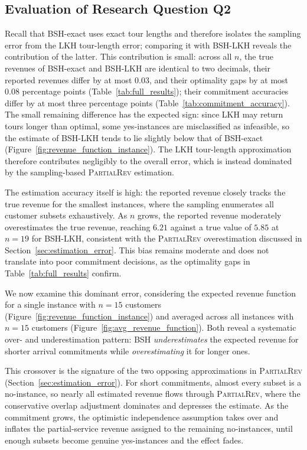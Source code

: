 \documentclass[11pt]{article}
\theoremstyle{plain}
\theoremstyle{definition}
\begin{document}
 

\subsection{Evaluation of Research Question Q2}\label{subsec:ErrorSources}
 Recall that BSH-exact uses exact tour lengths and therefore isolates the sampling error from the \ac{LKH} tour-length error; comparing it with BSH-\ac{LKH} reveals the contribution of the latter. This contribution is small: across all $n$, the true revenues of BSH-exact and BSH-\ac{LKH} are identical to two decimals, their reported revenues differ by at most $0.03$, and their optimality gaps by at most $0.08$ percentage points (Table~\ref{tab:full_results}); their commitment accuracies differ by at most three percentage points (Table~\ref{tab:commitment_accuracy}). The small remaining difference has the expected sign: since \ac{LKH} may return tours longer than optimal, some yes-instances are misclassified as infeasible, so the estimate of BSH-\ac{LKH} tends to lie slightly below that of BSH-exact (Figure~\ref{fig:revenue_function_instance}). The \ac{LKH} tour-length approximation therefore contributes negligibly to the overall error, which is instead dominated by the sampling-based \textsc{PartialRev} estimation.

 The estimation accuracy itself is high: the reported revenue closely tracks the true revenue for the smallest instances, where the sampling enumerates all customer subsets exhaustively. As $n$ grows, the reported revenue moderately overestimates the true revenue, reaching $6.21$ against a true value of $5.85$ at $n = 19$ for BSH-\ac{LKH}, consistent with the \textsc{PartialRev} overestimation discussed in Section~\ref{sec:estimation_error}. This bias remains moderate and does not translate into poor commitment decisions, as the optimality gaps in Table~\ref{tab:full_results} confirm.

 We now examine this dominant error, considering the expected revenue function for a single instance with $n = 15$ customers (Figure~\ref{fig:revenue_function_instance}) and averaged across all instances with $n = 15$ customers (Figure~\ref{fig:avg_revenue_function}). Both reveal a systematic over- and underestimation pattern: BSH \emph{underestimates} the expected revenue for shorter arrival commitments while \emph{overestimating} it for longer ones.
 
 This crossover is the signature of the two opposing approximations in \textsc{PartialRev} (Section~\ref{sec:estimation_error}). For short commitments, almost every subset is a no-instance, so nearly all estimated revenue flows through \textsc{PartialRev}, where the conservative overlap adjustment dominates and depresses the estimate. As the commitment grows, the optimistic independence assumption takes over and inflates the partial-service revenue assigned to the remaining no-instances, until enough subsets become genuine yes-instances and the effect fades.
 
\end{document}
